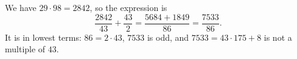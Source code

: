 We have $29\cdot98=2842$, so the expression is
\[\dfrac{2842}{43}+\dfrac{43}{2}=\dfrac{5684+1849}{86}=\boxed{\dfrac{7533}{86}}.\]
It is in lowest terms: $86=2\cdot43$, $7533$ is odd, and $7533=43\cdot175+8$ is not a multiple of $43$.
